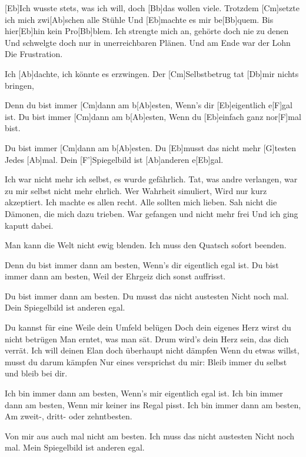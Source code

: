 

\begin{guitar}
	[Eb]Ich wusste stets, was ich will, doch [Bb]das wollen viele.
	Trotzdem [Cm]setzte ich mich zwi[Ab]schen alle Stühle
	Und [Eb]machte es mir be[Bb]quem.
	Bis hier[Eb]hin kein Pro[Bb]blem.
	Ich strengte mich an, gehörte doch nie zu denen
	Und schwelgte doch nur in unerreichbaren Plänen.
	Und am Ende war der Lohn
	Die Frustration.
	
	Ich [Ab]dachte, ich könnte es erzwingen.
	Der [Cm]Selbstbetrug tat [Db]mir nichts bringen,
	
	Denn du bist immer [Cm]dann am b[Ab]esten,
	Wenn's dir [Eb]eigentlich e[F]gal ist.
	Du bist immer [Cm]dann am b[Ab]esten,
	Wenn du [Eb]einfach ganz nor[F]mal bist.
	
	Du bist immer [Cm]dann am b[Ab]esten.
	Du [Eb]musst das nicht mehr [G]testen
	Jedes [Ab]mal.
	Dein [F']Spiegelbild ist [Ab]anderen e[Eb]gal.
	
	Ich war nicht mehr ich selbst, es wurde gefährlich.
	Tat, was andre verlangen, war zu mir selbst nicht mehr ehrlich.
	Wer Wahrheit simuliert,
	Wird nur kurz akzeptiert.
	Ich machte es allen recht. Alle sollten mich lieben.
	Sah nicht die Dämonen, die mich dazu trieben.
	War gefangen und nicht mehr frei
	Und ich ging kaputt dabei.
	
	Man kann die Welt nicht ewig blenden.
	Ich muss den Quatsch sofort beenden.
	
	Denn du bist immer dann am besten,
	Wenn's dir eigentlich egal ist.
	Du bist immer dann am besten,
	Weil der Ehrgeiz dich sonst auffrisst.

	Du bist immer dann am besten.
	Du musst das nicht austesten
	Nicht noch mal.
	Dein Spiegelbild ist anderen egal.
	
	Du kannst für eine Weile dein Umfeld belügen
	Doch dein eigenes Herz wirst du nicht betrügen
	Man erntet, was man sät. 
	Drum wird's dein Herz sein, das dich verrät.
	Ich will deinen Elan doch überhaupt nicht dämpfen
	Wenn du etwas willst, musst du darum kämpfen
	Nur eines versprichst du mir: 
	Bleib immer du selbst und bleib bei dir.
	
	Ich bin immer dann am besten,
	Wenn's mir eigentlich egal ist.
	Ich bin immer dann am besten,
	Wenn mir keiner ins Regal pisst.
	Ich bin immer dann am besten,
	Am zweit-, dritt- oder zehntbesten.
	
	Von mir aus auch mal nicht am besten.
	Ich muss das nicht austesten
	Nicht noch mal.
	Mein Spiegelbild ist anderen egal.
\end{guitar}